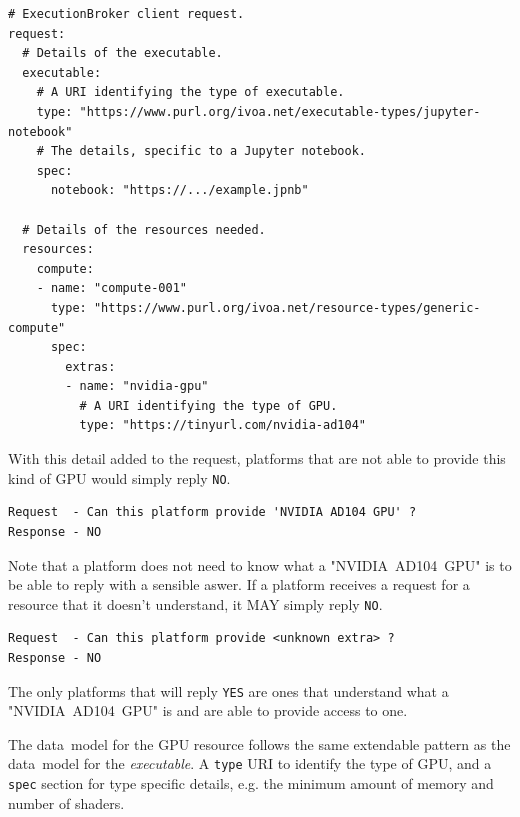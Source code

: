 \documentclass[11pt,a4paper]{ivoa}
\newcommand{\datamodel} {data~model}
\newcommand{\executable} {\textit{executable}}
\newcommand{\codeword}[1] {\texttt{#1}}
\newcommand{\gpu}[1] {GPU#1}
\newcommand{\nvidiagpu} {NVIDIA~AD104~GPU}
\begin{document}
\begin{lstlisting}[]
# ExecutionBroker client request.
request:
  # Details of the executable.
  executable:
    # A URI identifying the type of executable.
    type: "https://www.purl.org/ivoa.net/executable-types/jupyter-notebook"
    # The details, specific to a Jupyter notebook.
    spec:
      notebook: "https://.../example.jpnb"

  # Details of the resources needed.
  resources:
    compute:
    - name: "compute-001"
      type: "https://www.purl.org/ivoa.net/resource-types/generic-compute"
      spec:
        extras:
        - name: "nvidia-gpu"
          # A URI identifying the type of GPU.
          type: "https://tinyurl.com/nvidia-ad104"
\end{lstlisting}

With this detail added to the request, platforms that are not able to provide this kind of \gpu{}
would simply reply \codeword{NO}.

\begin{lstlisting}[]
Request  - Can this platform provide 'NVIDIA AD104 GPU' ?
Response - NO
\end{lstlisting}

Note that a platform does not need to know what a  "\nvidiagpu{}" is to be able to reply with a sensible aswer.
If a platform receives a request for a resource that it doesn't understand, it MAY simply reply \codeword{NO}.

\begin{lstlisting}[]
Request  - Can this platform provide <unknown extra> ?
Response - NO
\end{lstlisting}

The only platforms that will reply \codeword{YES} are ones that understand what a "\nvidiagpu{}"
is and are able to provide access to one.

The \datamodel{} for the \gpu{} resource follows the same extendable pattern as the \datamodel{} for
the \executable{}. A \codeword{type} URI to identify the type of \gpu{},
and a \codeword{spec} section for type specific details,
e.g. the minimum amount of memory and number of shaders.
\end{document}
